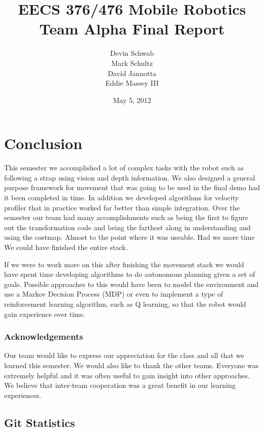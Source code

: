 \documentclass[10pt,letterpaper,final]{report}
\author{Devin Schwab\\
  Mark Schultz\\
  David Jannotta\\
  Eddie Massey III}
\title{EECS 376/476 Mobile Robotics\\
  Team Alpha Final Report} \date{May 5, 2012}
\begin{document}

\listoftodos
\maketitle

\tableofcontents
\newpage









\part{Conclusion}

This semester we accomplished a lot of complex tasks with the robot such as following a strap using vision and depth information. We also designed a general purpose framework for movement that was going to be used in the final demo had it been completed in time. In addition we developed algorithms for velocity profiler that in practice worked far better than simple integration. Over the semester our team had many accomplishments such as being the first to figure out the transformation code and being the farthest along in understanding and using the costmap. Almost to the point where it was useable. Had we more time We could have finished the entire stack.

If we were to work more on this after finishing the movement stack we would have spent time developing algorithms to do autonomous planning given a set of goals. Possible approaches to this would have been to model the environment and use a Markov Decision Process (MDP) or even to implement a type of reinforcement learning algorithm, such as Q learning, so that the robot would gain experience over time.

\section{Acknowledgements}
Our team would like to express our appreciation for the class and all that we learned this semester. We would also like to thank the other teams. Everyone was extremely helpful and it was often useful to gain insight into other approaches. We believe that inter-team cooperation was a great benefit in our learning experiences.



\appendix
\chapter{Git Statistics}
\end{document}
